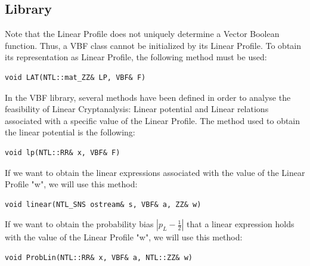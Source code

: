 \subsection{Library}

Note that the Linear Profile does not uniquely determine a Vector Boolean function. Thus, a VBF class cannot be initialized by its Linear Profile. To obtain its representation as Linear Profile, the following method must be used:

\begin{verbatim}
void LAT(NTL::mat_ZZ& LP, VBF& F)
\end{verbatim}

In the VBF library, several methods have been defined in order to analyse the feasibility of Linear Cryptanalysis: Linear potential and Linear relations associated with a specific value of the Linear Profile. The method used to obtain the linear potential is the following:

\begin{verbatim}
void lp(NTL::RR& x, VBF& F)
\end{verbatim}

If we want to obtain the linear expressions associated with the value of the Linear Profile "w", we will use this method:

\begin{verbatim}
void linear(NTL_SNS ostream& s, VBF& a, ZZ& w)
\end{verbatim}

If we want to obtain the probability bias $|p_L-\frac{1}{2}|$ that a linear expression holds with the value of the Linear Profile "w", we will use this method:

\begin{verbatim}
void ProbLin(NTL::RR& x, VBF& a, NTL::ZZ& w)
\end{verbatim}

